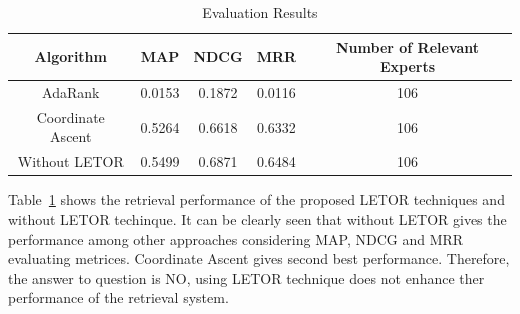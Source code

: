 \begin{table}
\centering
\begin{tabular}{|c|c|c|c|c|}
\hline \textbf{Algorithm} & \textbf{MAP} & \textbf{NDCG} & \textbf{MRR} & \textbf{Number of Relevant Experts}\\
\hline AdaRank & 0.0153 & 0.1872 & 0.0116 & 106\\
\hline Coordinate Ascent & 0.5264 & 0.6618 & 0.6332 & 106 \\
\hline Without LETOR  & 0.5499 & 0.6871 & 0.6484 & 106\\ 
\hline
\end{tabular}
\caption{Evaluation Results} \label{table:evaluationresult}
\end{table}

Table~\ref{table:evaluationresult} shows the retrieval performance of the proposed LETOR techniques and without LETOR techinque. It can be clearly seen
that without LETOR gives the performance among other approaches considering MAP, NDCG and MRR evaluating metrices. Coordinate Ascent gives second best 
performance. Therefore, the answer to question is NO, using LETOR technique does not enhance ther performance of the retrieval system.

